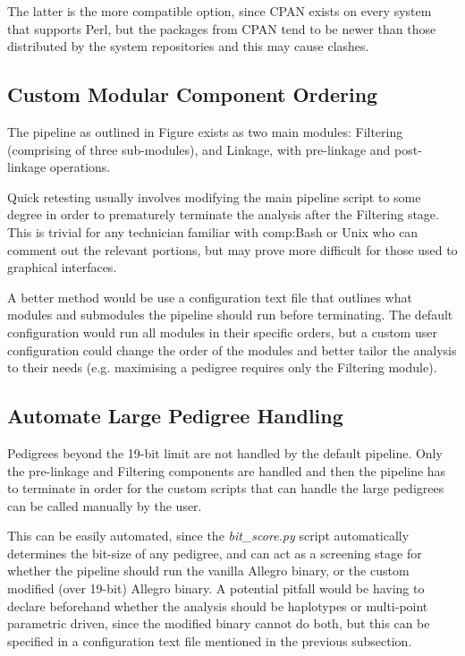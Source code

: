 The latter is the more compatible option, since CPAN exists on every system that supports Perl, but the packages from CPAN tend to be newer than those distributed by the system repositories and this may cause clashes.


\subsection{Custom Modular Component Ordering}

The pipeline as outlined in Figure exists as two main modules: Filtering (comprising of three sub-modules), and Linkage, with pre-linkage and post-linkage operations.

Quick retesting usually involves modifying the main pipeline script to some degree in order to prematurely terminate the analysis after the Filtering stage. This is trivial for any technician familiar with \gls{comp:Bash} or Unix who can comment out the relevant portions, but may prove more difficult for those used to graphical interfaces.

A better method would be use a configuration text file that outlines what modules and submodules the pipeline should run before terminating. The default configuration would run all modules in their specific orders, but a custom user configuration could change the order of the modules and better tailor the analysis to their needs (e.g. maximising a pedigree requires only the Filtering module).

\subsection{Automate Large Pedigree Handling}

Pedigrees beyond the 19-bit limit are not handled by the default pipeline. Only the pre-linkage and Filtering components are handled and then the pipeline has to terminate in order for the custom scripts that can handle the large pedigrees can be called manually by the user.

This can be easily automated, since the \textit{bit\_score.py} script automatically determines the bit-size of any pedigree, and can act as a screening stage for whether the pipeline should run the vanilla Allegro binary, or the custom modified (over 19-bit) Allegro binary. A potential pitfall would be having to declare beforehand whether the analysis should be haplotypes or multi-point parametric driven, since the modified binary cannot do both, but this can be specified in a configuration text file mentioned in the previous subsection.

